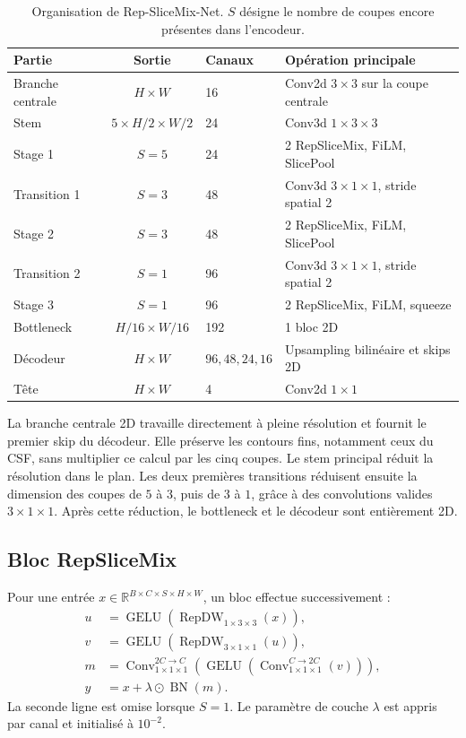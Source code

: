 \documentclass[11pt,a4paper]{article}
\begin{document}
\begin{table}[htbp]
\centering
\small
\caption{Organisation de Rep-SliceMix-Net. $S$ désigne le nombre de coupes
encore présentes dans l'encodeur.}
\label{tab:architecture}
\begin{tabularx}{\textwidth}{@{}lclY@{}}
\toprule
Partie & Sortie & Canaux & Opération principale \\
\midrule
Branche centrale & $H\times W$ & 16 & Conv2d $3\times3$ sur la coupe centrale \\
Stem & $5\times H/2\times W/2$ & 24 & Conv3d $1\times3\times3$ \\
Stage 1 & $S=5$ & 24 & 2 RepSliceMix, FiLM, SlicePool \\
Transition 1 & $S=3$ & 48 & Conv3d $3\times1\times1$, stride spatial 2 \\
Stage 2 & $S=3$ & 48 & 2 RepSliceMix, FiLM, SlicePool \\
Transition 2 & $S=1$ & 96 & Conv3d $3\times1\times1$, stride spatial 2 \\
Stage 3 & $S=1$ & 96 & 2 RepSliceMix, FiLM, squeeze \\
Bottleneck & $H/16\times W/16$ & 192 & 1 bloc 2D \\
Décodeur & $H\times W$ & $96,48,24,16$ & Upsampling bilinéaire et skips 2D \\
Tête & $H\times W$ & 4 & Conv2d $1\times1$ \\
\bottomrule
\end{tabularx}
\end{table}

La branche centrale 2D travaille directement à pleine résolution et fournit le
premier skip du décodeur. Elle préserve les contours fins, notamment ceux du
CSF, sans multiplier ce calcul par les cinq coupes. Le stem principal réduit la
résolution dans le plan. Les deux premières transitions réduisent ensuite la
dimension des coupes de $5$ à $3$, puis de $3$ à $1$, grâce à des convolutions
valides $3\times1\times1$. Après cette réduction, le bottleneck et le décodeur
sont entièrement 2D.

\subsection{Bloc RepSliceMix}

Pour une entrée $x\in\mathbb{R}^{B\times C\times S\times H\times W}$, un bloc
effectue successivement :
\begin{align}
  u &= \operatorname{GELU}(\operatorname{RepDW}_{1\times3\times3}(x)),\\
  v &= \operatorname{GELU}(\operatorname{RepDW}_{3\times1\times1}(u)),\\
  m &= \operatorname{Conv}_{1\times1\times1}^{2C\rightarrow C}
       \left(\operatorname{GELU}
       \left(\operatorname{Conv}_{1\times1\times1}^{C\rightarrow2C}(v)\right)
       \right),\\
  y &= x + \lambda\odot\operatorname{BN}(m).
\end{align}
La seconde ligne est omise lorsque $S=1$. Le paramètre de couche $\lambda$ est
appris par canal et initialisé à $10^{-2}$.
\end{document}
